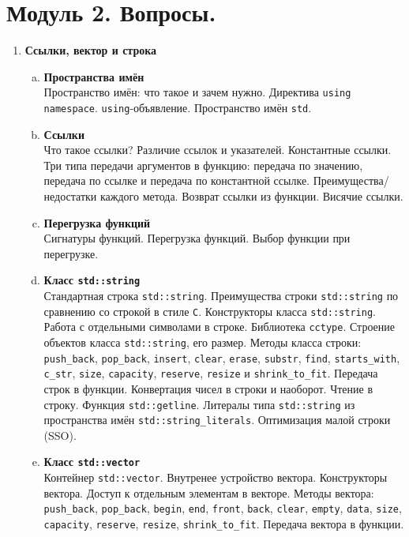 \documentclass{article}
\begin{document}

\section*{Модуль 2. Вопросы.}


\begin{enumerate}
\item \textbf{Ссылки, вектор и строка}

\begin{enumerate}[a.]
\item \textbf{Пространства имён}\\
Пространство имён: что такое и зачем нужно. Директива \texttt{using namespace}. \texttt{using}-объявление.
Пространство имён \texttt{std}.

\item \textbf{Ссылки}\\
Что такое ссылки? Различие ссылок и указателей. Константные ссылки. Три типа передачи аргументов в функцию: передача по значению, передача по ссылке и передача по константной ссылке. Преимущества/недостатки каждого метода. Возврат ссылки из функции. Висячие ссылки.

\item  \textbf{Перегрузка функций}\\
Сигнатуры функций. Перегрузка функций. Выбор функции при перегрузке.


\item \textbf{Класс \texttt{std::string}}\\
Стандартная строка \texttt{std::string}. Преимущества строки \texttt{std::string} по сравнению со строкой в стиле \texttt{C}. Конструкторы класса \texttt{std::string}. Работа с отдельными символами в строке. Библиотека \texttt{cctype}. Строение объектов класса \texttt{std::string}, его размер.  Методы класса строки: \texttt{push\_back}, \texttt{pop\_back}, \texttt{insert}, \texttt{clear}, \texttt{erase}, \texttt{substr}, \texttt{find}, \texttt{starts\_with},  \texttt{c\_str}, \texttt{size}, \texttt{capacity}, \texttt{reserve}, \texttt{resize} и \texttt{shrink\_to\_fit}. Передача строк в функции. Конвертация чисел в строки и наоборот. Чтение в строку. Функция \texttt{std::getline}. Литералы типа \texttt{std::string} из пространства имён \texttt{std::string\_literals}. Оптимизация малой строки (SSO).


\item \textbf{Класс \texttt{std::vector}}\\
Контейнер \texttt{std::vector}. Внутренее устройство вектора. Конструкторы вектора. Доступ к отдельным элементам в векторе. Методы вектора: \texttt{push\_back}, \texttt{pop\_back}, \texttt{begin}, \texttt{end}, \texttt{front}, \texttt{back}, \texttt{clear}, \texttt{empty}, \texttt{data}, \texttt{size}, \texttt{capacity}, \texttt{reserve}, \texttt{resize}, \texttt{shrink\_to\_fit}. Передача вектора в функции.



\end{enumerate}
\end{enumerate}
\end{document}
